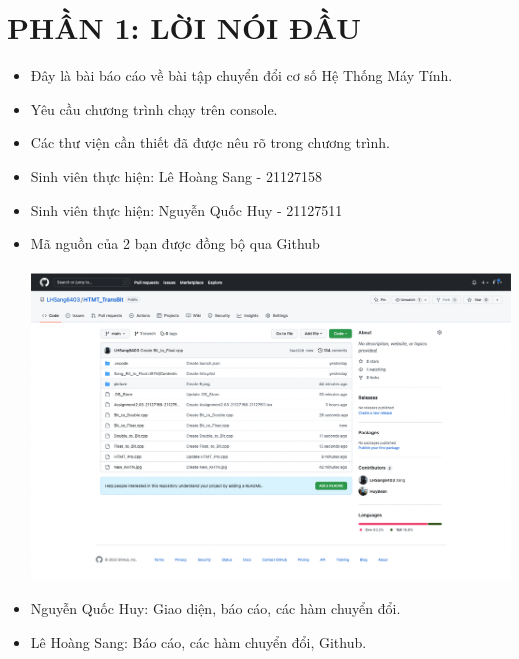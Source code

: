 \documentclass[12pt,a4paper]{article}
\begin{document}
\section{\textbf{\color{red}PHẦN 1: LỜI NÓI ĐẦU}}
\begin{itemize}
    \item \Large Đây là bài báo cáo về bài tập chuyển đổi cơ số Hệ Thống Máy Tính.
    \item \Large Yêu cầu chương trình chạy trên console.
    \item \Large Các thư viện cần thiết đã được nêu rõ trong chương trình.
    \item \Large Sinh viên thực hiện: Lê Hoàng Sang - 21127158
    \item \Large Sinh viên thực hiện: Nguyễn Quốc Huy - 21127511
    \item \Large Mã nguồn của 2 bạn được đồng bộ qua Github \\ \\
    \includegraphics[scale= 0.2]{picture/Github.png} \\
    \item \Large Nguyễn Quốc Huy: Giao diện, báo cáo, các hàm chuyển đổi. \\
    \item \Large Lê Hoàng Sang: Báo cáo, các hàm chuyển đổi, Github. \\
\end{itemize}
\newpage
\tableofcontents
\newpage
\end{document}
